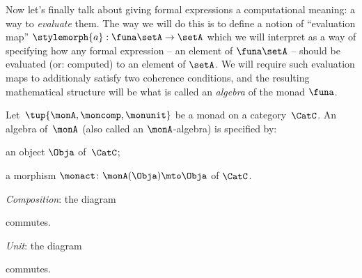 Now let's finally talk about giving formal expressions a computational meaning: a way to \emph{evaluate} them. The way we will do this is to define a notion of ``evaluation map'' $\stylemorph{a}: \funa \setA \to \setA$ which we will interpret as a way of specifying how any formal expression -- an element of $\funa \setA$ -- should be evaluated (or: computed) to an element of $\setA$. We will require such evaluation maps to additionaly satisfy two coherence conditions, and the resulting mathematical structure will be what is called an \emph{algebra} of the monad $\funa$. 



\begin{ctdefinition}
    \label{def:algebramon}
Let~$\tup{\monA, \moncomp, \monunit}$ be a monad on a category~$\CatC$. An algebra of~$\monA$ (also called an $\monA$-algebra) is specified by: \

\constit
\begin{compactenum}
\item an object $\Obja$ of~$\CatC$;
\item a morphism $\monact\colon \monA(\Obja) \mto \Obja$ of $\CatC$.
\end{compactenum}
\condit
\begin{compactenum}
\item \emph{Composition}: the diagram
\begin{center}
  \end{center}
commutes.
\item \emph{Unit}: the diagram 
\begin{center}
  \end{center}
commutes.
\end{compactenum}
\end{ctdefinition}


